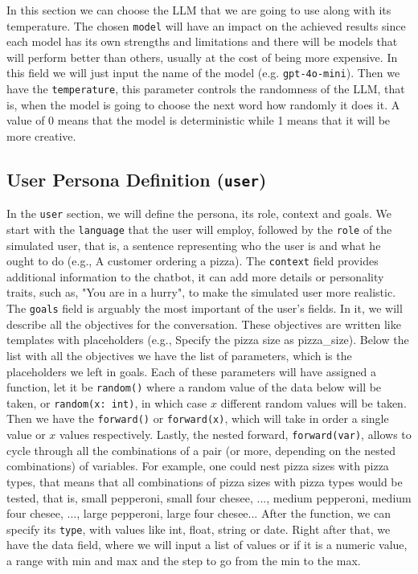 In this section we can choose the \acl{LLM} that we are going to use
along with its temperature.
The chosen \texttt{model} will have an impact on the achieved results
since each model has its own strengths and limitations
and there will be models that will perform better than others,
usually at the cost of being more expensive.
In this field we will just input the name of the model (e.g. \texttt{gpt-4o-mini}).
Then we have the \texttt{temperature},
this parameter controls the randomness of the \ac{LLM},
that is, when the model is going to choose the next word
how randomly it does it.
A value of 0 means that the model is deterministic
while 1 means that it will be more creative.

\subsection{User Persona Definition (\texttt{user})}

In the \texttt{user} section, we will define
the persona, its role, context and goals.
We start with the \texttt{language} that the user will employ,
followed by the \texttt{role} of the simulated user,
that is, a sentence representing who the user is
and what he ought to do (e.g., A customer ordering a pizza).
The \texttt{context} field provides additional information to the chatbot,
it can add more details or personality traits, such as,
"You are in a hurry", to make the simulated user more realistic.
The \texttt{goals} field is arguably the most important of the user's fields.
In it, we will describe all the objectives for the conversation.
These objectives are written like templates with placeholders
(e.g., Specify the pizza size as {{pizza\_size}}).
Below the list with all the objectives
we have the list of parameters, which is the placeholders we left in goals.
Each of these parameters will have assigned a function,
let it be \texttt{random()} where a random value of the data below will be taken,
or \texttt{random(x: int)}, in which case $x$ different random values will be taken.
Then we have the \texttt{forward()} or \texttt{forward(x)},
which will take in order a single value or $x$ values respectively.
Lastly, the nested forward, \texttt{forward(var)},
allows to cycle through all the combinations of a pair (or more, depending on the nested combinations) of variables.
For example, one could nest pizza sizes with pizza types,
that means that all combinations of pizza sizes with pizza types would be tested,
that is, small pepperoni, small four chesee, ..., medium pepperoni, medium four chesee, ..., large pepperoni, large four chesee...
After the function, we can specify its \texttt{type},
with values like int, float, string or date.
Right after that, we have the data field,
where we will input a list of values
or if it is a numeric value, a range with min and max
and the step to go from the min to the max.


